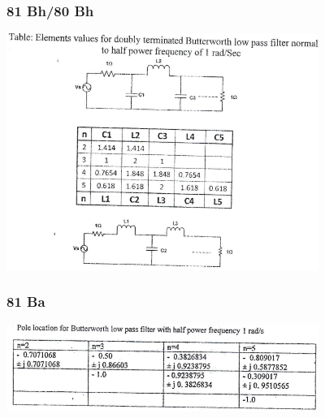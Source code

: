 \documentclass[12pt]{article}
\begin{document}
\subsubsection{81 Bh/80 Bh}
\includegraphics[width=4in]{fd_2}
\label{sec:tables_81ba}
\subsubsection{81 Ba}
\includegraphics[width=4in]{fd_3}
\label{sec:tables_80bh}
\end{document}
